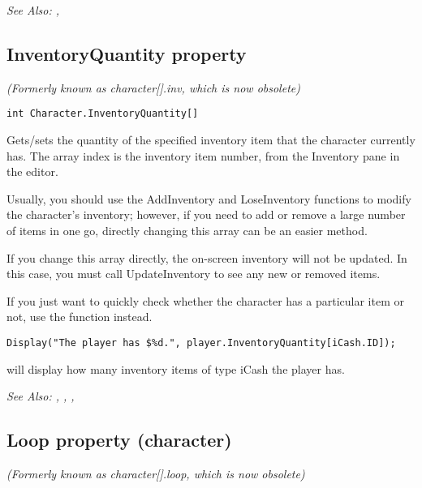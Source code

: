 \it{See Also:} ,


\subsection{InventoryQuantity property}\label{Character.InventoryQuantity}%

\it{(Formerly known as character[].inv, which is now obsolete)}

\begin{verbatim}
int Character.InventoryQuantity[]
\end{verbatim}
Gets/sets the quantity of the specified inventory item that the character currently has.
The array index is the inventory item number, from the Inventory pane in the editor.

Usually, you should use the AddInventory and LoseInventory functions to modify the
character's inventory; however, if you need to add or remove a large number of items
in one go, directly changing this array can be an easier method.

If you change this array directly, the on-screen inventory will not be updated. In this
case, you must call UpdateInventory to see any new or removed items.

If you just want to quickly check whether the character has a particular item or
not, use the  function instead.

\begin{verbatim}
Display("The player has $%d.", player.InventoryQuantity[iCash.ID]);
\end{verbatim}
will display how many inventory items of type iCash the player has.

\it{See Also:} ,
,
,


\subsection{Loop property (character)}\label{Character.Loop}%

\it{(Formerly known as character[].loop, which is now obsolete)}

